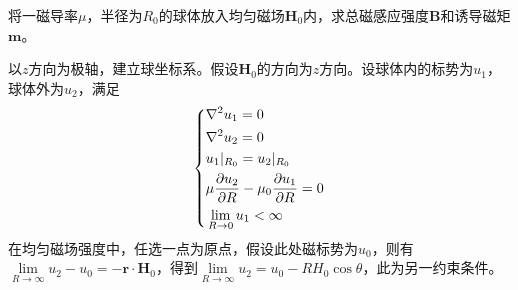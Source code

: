 \documentclass{mynote}
\begin{document}
\begin{exercise}{3.9}
    将一磁导率$\mu$，半径为$R_0$的球体放入均匀磁场$\bm{H}_0$内，求总磁感应强度$\bm{B}$和诱导磁矩$\bm{m}$。
\end{exercise}
\begin{solution}
以$z$方向为极轴，建立球坐标系。假设$\bm{H}_0$的方向为$z$方向。设球体内的标势为$u_1$，球体外为$u_2$，满足
\[
    \left\{
        \begin{aligned}
            & \nabla^2 u_1 = 0 \\
            & \nabla^2 u_2 = 0 \\
            & u_1|_{R_0} = u_2|_{R_0} \\
            & \mu \dfrac{\partial u_2}{\partial R} - \mu_0 \dfrac{\partial u_1}{\partial R} = 0\\
            & \lim_{R\to 0} u_1 < \infty 
        \end{aligned} 
    \right.
\]
在均匀磁场强度中，任选一点为原点，假设此处磁标势为$u_0$，则有$\lim\limits_{R \to \infty}u_2 - u_0 = -\bm{r} \cdot \bm{H}_0$，得到$\lim\limits_{R \to \infty}u_2 = u_0 - R H_0 \cos \theta$，此为另一约束条件。


\end{solution}
\end{document}
